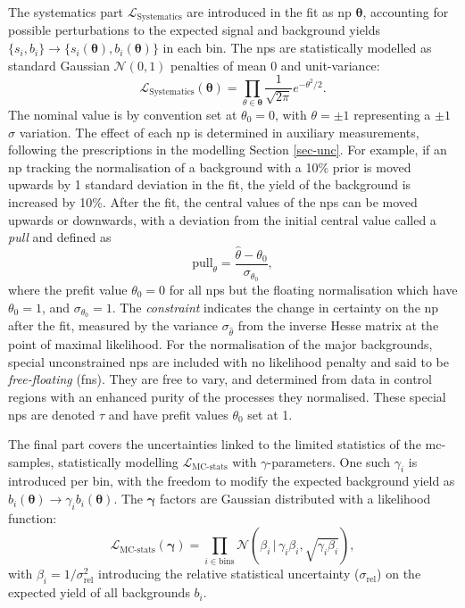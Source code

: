 The systematics part $\mathcal{L}_{\text{Systematics}}$ are introduced in the fit as \gls{np} $\boldsymbol{\theta}$, accounting for possible perturbations to the expected signal and background yields $\{s_i, b_i\} \rightarrow \{s_i(\boldsymbol{\theta}), b_i(\boldsymbol{\theta})\}$ in each bin. The \gls{np}s are statistically modelled as standard Gaussian $\mathcal{N}(0, 1)$ penalties of mean 0 and unit-variance: \[ \mathcal{L}_{\text{Systematics}}(\boldsymbol{\theta}) = \prod_{\theta \in \boldsymbol{\theta}} \frac{1}{\sqrt{2\pi}} e^{- \theta^2/2}.\] The nominal value is by convention set at $\theta_0 = 0$, with $\theta = \pm 1$ representing a $\pm1$ $\sigma$ variation. The effect of each \gls{np} is determined in auxiliary measurements, following the prescriptions in the modelling Section \ref{sec-unc}. For example, if an \gls{np} tracking the normalisation of a background with a 10\% prior is moved upwards by 1 standard deviation in the fit, the yield of the background is increased by 10\%. After the fit, the central values of the \gls{np}s can be moved upwards or downwards, with a deviation from the initial central value called a \textit{pull} and defined as \[ \text{pull}_{\theta} = \frac{\hat{\theta} - \theta_0}{\sigma_{\theta_0}}, \] where the prefit value $\theta_0 = 0 $ for all \gls{np}s but the floating normalisation which have $\theta_0 = 1$, and $\sigma_{\theta_0} = 1$. The \textit{constraint} indicates the change in certainty on the \gls{np} after the fit, measured by the variance $\sigma_{\hat{\theta}}$ from the inverse Hesse matrix at the point of maximal likelihood. For the normalisation of the major backgrounds, special unconstrained \gls{np}s are included with no likelihood penalty and said to be \textit{free-floating} (\gls{fn}s). They are free to vary, and determined from data in control regions with an enhanced purity of the processes they normalised. These special \gls{np}s are denoted $\tau$ and have prefit values $\theta_0$ set at 1.  

The final part covers the uncertainties linked to the limited statistics of the \gls{mc}-samples, statistically modelling $\mathcal{L}_{\text{MC-stats}}$ with $\gamma$-parameters. One such $\gamma_i$ is introduced per bin, with the freedom to modify the expected background yield as $b_i(\boldsymbol{\theta}) \rightarrow \gamma_i b_i(\boldsymbol{\theta})$. The $\boldsymbol{\gamma}$ factors are Gaussian distributed with a likelihood function: \[\mathcal{L}_{\text{MC-stats}}(\boldsymbol{\gamma}) = \prod_{i\in \textrm{bins}} \mathcal{N} \left(\beta_i \,|\, \gamma_i\beta_i, \sqrt{\gamma_i\beta_i} \right),\] with $\beta_i = 1 / \sigma_{\text{rel}}^2$ introducing the relative statistical uncertainty ($\sigma_{\text{rel}}$) on the expected yield of all backgrounds $b_i$. \\


